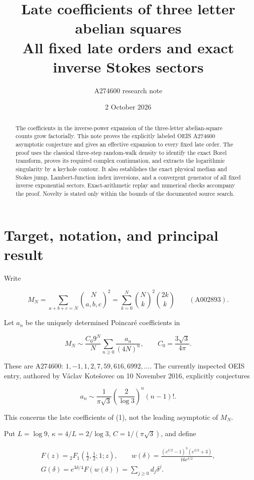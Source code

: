 \documentclass[11pt,letterpaper]{article}
\title{\textbf{Late coefficients of three letter\\abelian squares}\\[0.5em]\large All fixed late orders and exact inverse Stokes sectors}
\author{A274600 research note}
\date{2 October 2026}
\theoremstyle{remark}
\begin{document}
\maketitle
\begin{abstract}
The coefficients in the inverse-power expansion of the three-letter abelian-square counts grow factorially. This note proves the explicitly labeled OEIS A274600 asymptotic conjecture and gives an effective expansion to every fixed late order. The proof uses the classical three-step random-walk density to identify the exact Borel transform, proves its required complex continuation, and extracts the logarithmic singularity by a keyhole contour. It also establishes the exact physical median and Stokes jump, Lambert-function index inversions, and a convergent generator of all fixed inverse exponential sectors. Exact-arithmetic replay and numerical checks accompany the proof. Novelty is stated only within the bounds of the documented source search.
\end{abstract}
\section{Target, notation, and principal
result}\label{target-notation-and-principal-result}

Write

\[
M_N=\sum_{a+b+c=N}\binom{N}{a,b,c}^{\!2}
    =\sum_{k=0}^N\binom Nk^2\binom{2k}k\qquad(\text{A002893}).
\]

Let \(a_n\) be the uniquely determined Poincaré coefficients in

\[
M_N\sim \frac{C_0 9^N}{N}\sum_{n\ge0}\frac{a_n}{(4N)^n},
\qquad C_0=\frac{3\sqrt3}{4\pi}.
\tag{1}
\]

These are A274600: \(1,-1,1,2,7,59,616,6992,\ldots\). The currently
inspected OEIS entry, authored by Václav Kotešovec on 10 November 2016,
explicitly conjectures

\[
a_n\sim\frac1{\pi\sqrt3}\left(\frac2{\log3}\right)^n(n-1)!.
\tag{2}
\]

This concerns the late coefficients of (1), not the leading asymptotic
of \(M_N\).

Put \(L=\log9\), \(\kappa=4/L=2/\log3\), \(C=1/(\pi\sqrt3)\), and define

\[
\begin{gathered}
F(z)={}_2F_1\left(\frac12,\frac12;1;z\right),\qquad
w(\delta)=\frac{(e^{\delta/2}-1)^3(e^{\delta/2}+3)}{16e^{\delta/2}},\\
G(\delta)=e^{3\delta/4}F(w(\delta))=\sum_{j\ge0}d_j\delta^j.
\end{gathered}
\tag{3}
\]
\end{document}
